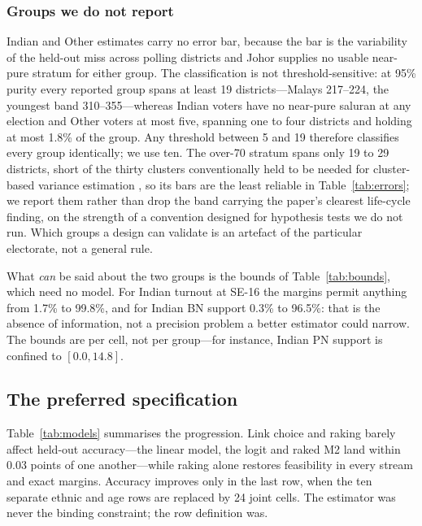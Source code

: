 \documentclass[11pt]{article}
\begin{document}
\subsubsection*{Groups we do not report}

Indian and Other estimates carry no error bar, because the bar is the variability of the held-out miss across polling districts and Johor supplies no usable near-pure stratum for either group. The classification is not threshold-sensitive: at 95\% purity every reported group spans at least 19 districts---Malays 217--224, the youngest band 310--355---whereas Indian voters have no near-pure saluran at any election and Other voters at most five, spanning one to four districts and holding at most 1.8\% of the group. Any threshold between 5 and 19 therefore classifies every group identically; we use ten. The over-70 stratum spans only 19 to 29 districts, short of the thirty clusters conventionally held to be needed for cluster-based variance estimation \cite{cameronmiller2015,cameronetal2008}, so its bars are the least reliable in Table~\ref{tab:errors}; we report them rather than drop the band carrying the paper's clearest life-cycle finding, on the strength of a convention designed for hypothesis tests we do not run. Which groups a design can validate is an artefact of the particular electorate, not a general rule.

What \emph{can} be said about the two groups is the bounds of Table~\ref{tab:bounds}, which need no model. For Indian turnout at SE-16 the margins permit anything from 1.7\% to 99.8\%, and for Indian BN support 0.3\% to 96.5\%: that is the absence of information, not a precision problem a better estimator could narrow. The bounds are per cell, not per group---for instance, Indian PN support is confined to $[0.0, 14.8]$.

\subsection{The preferred specification}
\label{sec:strategy-preferred}

Table~\ref{tab:models} summarises the progression. Link choice and raking barely affect held-out accuracy---the linear model, the logit and raked M2 land within 0.03 points of one another---while raking alone restores feasibility in every stream and exact margins. Accuracy improves only in the last row, when the ten separate ethnic and age rows are replaced by 24 joint cells. The estimator was never the binding constraint; the row definition was.
\end{document}
